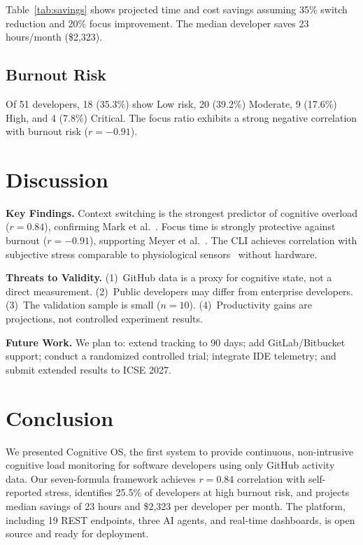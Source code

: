 \documentclass[conference]{IEEEtran}
\begin{document}
Table~\ref{tab:savings} shows projected time and cost savings assuming 35\% switch reduction and 20\% focus improvement. The median developer saves 23 hours/month (\$2,323).

\subsection{Burnout Risk}

Of 51 developers, 18 (35.3\%) show Low risk, 20 (39.2\%) Moderate, 9 (17.6\%) High, and 4 (7.8\%) Critical. The focus ratio exhibits a strong negative correlation with burnout risk ($r = -0.91$).

\section{Discussion}

\textbf{Key Findings.} Context switching is the strongest predictor of cognitive overload ($r = 0.84$), confirming Mark et al.~\cite{mark2008cost}. Focus time is strongly protective against burnout ($r = -0.91$), supporting Meyer et al.~\cite{meyer2019today}. The CLI achieves correlation with subjective stress comparable to physiological sensors~\cite{fritz2014developers} without hardware.

\textbf{Threats to Validity.} (1)~GitHub data is a proxy for cognitive state, not a direct measurement. (2)~Public developers may differ from enterprise developers. (3)~The validation sample is small ($n = 10$). (4)~Productivity gains are projections, not controlled experiment results.

\textbf{Future Work.} We plan to: extend tracking to 90 days; add GitLab/Bitbucket support; conduct a randomized controlled trial; integrate IDE telemetry; and submit extended results to ICSE 2027.

\section{Conclusion}

We presented Cognitive OS, the first system to provide continuous, non-intrusive cognitive load monitoring for software developers using only GitHub activity data. Our seven-formula framework achieves $r = 0.84$ correlation with self-reported stress, identifies 25.5\% of developers at high burnout risk, and projects median savings of 23 hours and \$2,323 per developer per month. The platform, including 19 REST endpoints, three AI agents, and real-time dashboards, is open source and ready for deployment.

\balance


\end{document}
